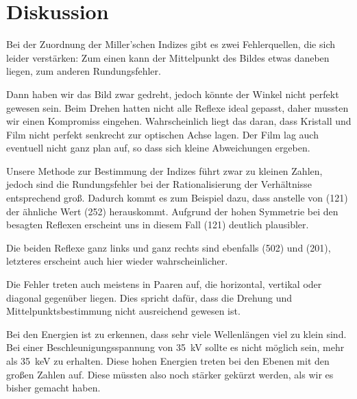 \section{Diskussion}

Bei der Zuordnung der Miller'schen Indizes gibt es zwei Fehlerquellen, die sich
leider verstärken: Zum einen kann der Mittelpunkt des Bildes etwas daneben
liegen, zum anderen Rundungsfehler.

Dann haben wir das Bild zwar gedreht, jedoch könnte der Winkel nicht perfekt
gewesen sein. Beim Drehen hatten nicht alle Reflexe ideal gepasst, daher
mussten wir einen Kompromiss eingehen. Wahrscheinlich liegt das daran, dass
Kristall und Film nicht perfekt senkrecht zur optischen Achse lagen. Der Film
lag auch eventuell nicht ganz plan auf, so dass sich kleine Abweichungen
ergeben.

Unsere Methode zur Bestimmung der Indizes führt zwar zu kleinen Zahlen, jedoch
sind die Rundungsfehler bei der Rationalisierung der Verhältnisse entsprechend
groß. Dadurch kommt es zum Beispiel dazu, dass anstelle von (121) der ähnliche
Wert (252)
herauskommt. Aufgrund der hohen Symmetrie bei den besagten Reflexen erscheint
uns in diesem Fall (121) deutlich plausibler.

Die beiden Reflexe ganz links und ganz rechts sind ebenfalls (502) und (201),
letzteres erscheint auch hier wieder wahrscheinlicher.

Die Fehler treten auch meistens in Paaren auf, die horizontal, vertikal oder
diagonal gegenüber liegen. Dies spricht dafür, dass die Drehung und
Mittelpunktsbestimmung nicht ausreichend gewesen ist.

Bei den Energien ist zu erkennen, dass sehr viele Wellenlängen viel zu klein
sind. Bei einer Beschleunigungsspannung von \SI{35}{\kilo\volt} sollte es
nicht möglich sein, mehr als \SI{35}{\kilo\electronvolt} zu erhalten. Diese
hohen Energien treten bei den Ebenen mit den großen Zahlen auf. Diese müssten
also noch stärker gekürzt werden, als wir es bisher gemacht haben.


